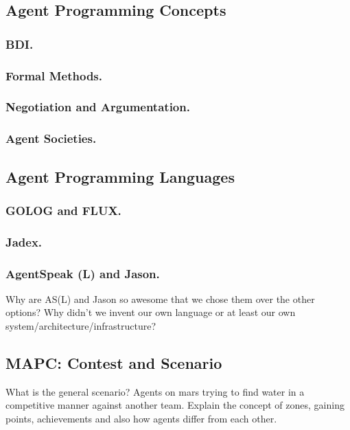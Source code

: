 \subsection{Agent Programming Concepts}
\subsubsection{BDI.}
\subsubsection{Formal Methods.}
\subsubsection{Negotiation and Argumentation.}
\subsubsection{Agent Societies.}
\subsection{Agent Programming Languages}
\subsubsection{GOLOG and FLUX.}
\subsubsection{Jadex.}
\subsubsection{AgentSpeak (L) and Jason.}
Why are AS(L) and Jason so awesome that we chose them over the other options? Why didn't we invent our own language or at least our own system/architecture/infrastructure?
\subsection{MAPC: Contest and Scenario}
What is the general scenario? Agents on mars trying to find water in a competitive manner against another team. Explain the concept of zones, gaining points, achievements and also how agents differ from each other.
